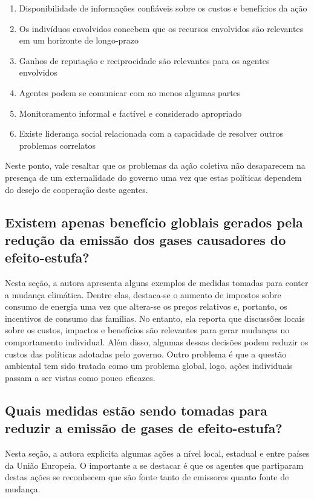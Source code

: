 \documentclass[11pt]{article}
\begin{document}
\begin{enumerate}
\item Disponibilidade de informações confiáveis sobre os custos e benefícios da ação
\item Os indivíduos envolvidos concebem que os recursos envolvidos são relevantes em um horizonte de longo-prazo
\item Ganhos de reputação e reciprocidade são relevantes para os agentes envolvidos
\item Agentes podem se comunicar com ao menos algumas partes
\item Monitoramento informal e factível e considerado apropriado
\item Existe liderança social relacionada com a capacidade de resolver outros problemas correlatos
\end{enumerate}

Neste ponto, vale resaltar que os problemas da ação coletiva não desaparecem na presença de um externalidade do governo uma vez que estas políticas dependem do desejo de cooperação deste agentes.

\subsection{Existem apenas benefício globlais gerados pela redução da emissão dos gases causadores do efeito-estufa?}
\label{sec:org35b87f7}

Nesta seção, a autora apresenta alguns exemplos de medidas tomadas para conter a mudança climática.
Dentre elas, destaca-se o aumento de impostos sobre consumo de energia uma vez que altera-se os preços relativos e, portanto, os incentivos de consumo das famílias.
No entanto, ela reporta que discussões locais sobre os custos, impactos e benefícios são relevantes para gerar mudanças no comportamento individual.
Além disso, algumas dessas decisões podem reduzir os custos das políticas adotadas pelo governo.
Outro problema é que a questão ambiental tem sido tratada como um problema global, logo, ações individuais passam a ser vistas como pouco eficazes.

\subsection{Quais medidas estão sendo tomadas para reduzir a emissão de gases de efeito-estufa?}
\label{sec:org820e0f5}

Nesta seção, a autora explicita algumas ações a nível local, estadual e entre países da União Europeia. 
O importante a se destacar é que os agentes que partiparam destas ações se reconhecem que são fonte tanto de emissores quanto fonte de mudança.
\end{document}

